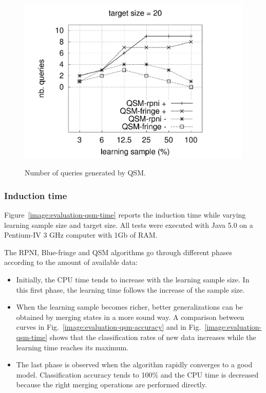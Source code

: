 \begin{figure}
{  \includegraphics[trim=30mm 0mm 35mm 0mm, clip, page=4]{src/5-evaluation/images/queries}
}
\caption{Number of queries generated by QSM\label{image:evaluation-qsm-number-of-questions}.}
\end{figure}

\subsubsection*{Induction time\label{cpu:time}}

Figure~\ref{image:evaluation-qsm-time} reports the induction time while varying learning sample size and target size. All tests were executed with Java 5.0 on a Pentium-IV 3 GHz computer with 1Gb of RAM. 

The RPNI, Blue-fringe and QSM algorithms go through different phases according to the amount of available data:
\begin{itemize} 
\item Initially, the CPU time tends to increase with the learning sample size. In this first phase, the learning time follows the increase of the sample size. 
\item When the learning sample becomes richer, better generalizations can be obtained by merging states in a more sound way. A comparison between curves in Fig.~\ref{image:evaluation-qsm-accuracy} and in Fig.~\ref{image:evaluation-qsm-time} shows that the classification rates of new data increases while the learning time reaches its maximum. 
\item The last phase is observed when the algorithm rapidly converges to a good model. Classification accuracy tends to 100\% and the CPU time is decreased because the right merging operations are performed directly. 
\end{itemize}

